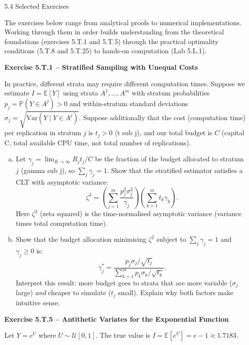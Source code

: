 \documentclass[aspectratio=169,10pt]{beamer}
\begin{document}
\begin{frame}[allowframebreaks]{5.4 Selected Exercises}

The exercises below range from analytical proofs to numerical implementations.
Working through them in order builds understanding from the theoretical
foundations (exercises 5.T.1 and 5.T.5) through the practical optimality
conditions (5.T.8 and 5.T.25) to hands-on computation (Lab 5.L.1).

\medskip
\textbf{Exercise 5.T.1 -- Stratified Sampling with Unequal Costs}

In practice, different strata may require different computation times.
Suppose we estimate $I = \mathbb{E}[Y]$ using strata $A^1, \ldots, A^m$ with
stratum probabilities $p_j = \mathbb{P}(Y \in A^j) > 0$ and within-stratum
standard deviations $\sigma_j = \sqrt{\mathrm{Var}(Y \mid Y \in A^j)}$.
Suppose additionally that the cost (computation time) per replication in
stratum $j$ is $t_j > 0$ (t sub j), and our total budget is $C$ (capital C,
total available CPU time, not total number of replications).

\begin{enumerate}[(a)]
  \item Let $\gamma_j = \lim_{R \to \infty} R_j t_j / C$ be the fraction of the
        budget allocated to stratum $j$ (gamma sub j), so $\sum_j \gamma_j = 1$.
        Show that the stratified estimator satisfies a CLT with asymptotic
        variance:
        \[
          \zeta^2 = \left(\sum_{j=1}^m \frac{p_j^2 \sigma_j^2}{\gamma_j}\right)
                    \left(\sum_{k=1}^m t_k \gamma_k\right).
        \]
        Here $\zeta^2$ (zeta squared) is the time-normalised asymptotic variance
        (variance times total computation time).

  \item Show that the budget allocation minimising $\zeta^2$ subject to
        $\sum_j \gamma_j = 1$ and $\gamma_j \ge 0$ is:
        \[
          \gamma_j^* = \frac{p_j \sigma_j / \sqrt{t_j}}{\sum_{k=1}^m p_k \sigma_k / \sqrt{t_k}}.
        \]
        Interpret this result: more budget goes to strata that are more variable
        ($\sigma_j$ large) \emph{and} cheaper to simulate ($t_j$ small).
        Explain why both factors make intuitive sense.
\end{enumerate}

\framebreak

\textbf{Exercise 5.T.5 -- Antithetic Variates for the Exponential Function}

Let $Y = e^U$ where $U \sim \mathcal{U}[0,1]$.  The true value is
$I = \mathbb{E}[e^U] = e - 1 \approx 1.7183$.


\end{frame}
\end{document}
